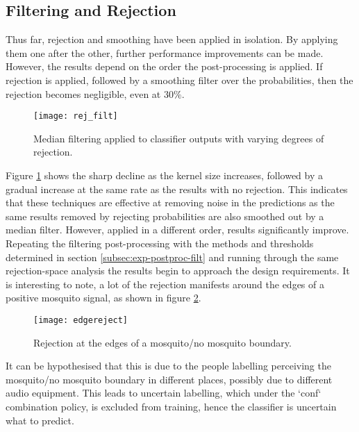     \subsection{Filtering and Rejection}
    \label{subsec:exp-postproc-filtrej}
        Thus far, rejection and smoothing have been applied in isolation. By applying them one after the other, further performance improvements can be made. However, the results depend on the order the post-processing is applied. If rejection is applied, followed by a smoothing filter over the probabilities, then the rejection becomes negligible, even at $30\%$. 
        \begin{figure}[ht]
            \centering
            \texttt{[image: rej\_filt]}
            \caption{Median filtering applied to classifier outputs with varying degrees of rejection.}
            \label{fig:exp-postproc-rejfilt}
        \end{figure}
        Figure \ref{fig:exp-postproc-rejfilt} shows the sharp decline as the kernel size increases, followed by a gradual increase at the same rate as the results with no rejection. This indicates that these techniques are effective at removing noise in the predictions as the same results removed by rejecting probabilities are also smoothed out by a median filter. However, applied in a different order, results significantly improve. Repeating the filtering post-processing with the methods and thresholds determined in section \ref{subsec:exp-postproc-filt} and running through the same rejection-space analysis the results begin to approach the design requirements. It is interesting to note, a lot of the rejection manifests around the edges of a positive mosquito signal, as shown in figure \ref{fig:exp-postproc-rejfilt-edge}. 
        \begin{figure}[ht]
            \centering
            \texttt{[image: edgereject]}
            \caption{Rejection at the edges of a mosquito/no mosquito boundary.}
            \label{fig:exp-postproc-rejfilt-edge}
        \end{figure}
        It can be hypothesised that this is due to the people labelling perceiving the mosquito/no mosquito boundary in different places, possibly due to different audio equipment. This leads to uncertain labelling, which under the `conf` combination policy, is excluded from training, hence the classifier is uncertain what to predict.